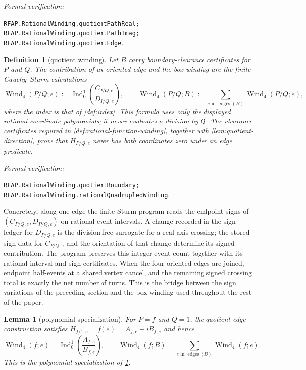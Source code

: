 \documentclass[11pt]{article}
\newtheorem{lemma}[theorem]{Lemma}
\newtheorem{definition}[theorem]{Definition}
\newcommand{\Wind}{\operatorname{Wind}}
\newcommand{\Ind}{\operatorname{Ind}}
\newcommand{\leanref}[1]{\par\smallskip\noindent
  \emph{Formal verification:}\par\nobreak
  {\raggedright\nolinkurl{#1}.\par}}
\begin{document}
\leanref{RFAP.RationalWinding.quotientPathReal;
RFAP.RationalWinding.quotientPathImag;
RFAP.RationalWinding.quotientEdge}

\begin{definition}[quotient winding]
\label{def:quotient-winding}
Let $B$ carry boundary-clearance certificates for $P$ and $Q$.  The
contribution of an oriented edge and the box winding are the finite
Cauchy--Sturm calculations
\[
 \Wind_4(P/Q;e)
   :=\Ind_0^1\!\left(\frac{C_{P/Q,e}}{D_{P/Q,e}}\right),
 \qquad
 \Wind_4(P/Q;B)
   :=\sum_{e\text{ in }\operatorname{edges}(B)}\Wind_4(P/Q;e),
\]
where the index is that of \cref{def:index}.  This formula uses only the
displayed rational coordinate polynomials; it never evaluates a division
by $Q$.  The clearance certificates required in
\cref{def:rational-function-winding}, together with
\cref{lem:quotient-direction}, prove that $H_{P/Q,e}$ never has both
coordinates zero under an edge predicate.
\end{definition}

\leanref{RFAP.RationalWinding.quotientBoundary;
RFAP.RationalWinding.rationalQuadrupledWinding}

Concretely, along one edge the finite Sturm program reads the endpoint signs
of $(C_{P/Q,e},D_{P/Q,e})$ on rational event intervals.  A change recorded
in the sign ledger for $D_{P/Q,e}$ is the division-free surrogate for a
real-axis crossing; the stored sign data for $C_{P/Q,e}$ and the orientation
of that change determine its signed contribution.  The program preserves
this integer event count together with its rational interval and sign
certificates.  When the four oriented edges are joined, endpoint half-events at
a shared vertex cancel, and the remaining signed crossing total is exactly
the net number of turns.  This is the bridge between the sign variations of
the preceding section and the box winding used throughout the rest of the
paper.

\begin{lemma}[polynomial specialization]
\label{lem:polynomial-winding-specialization}
For $P=f$ and $Q=1$, the quotient-edge construction satisfies
$H_{f/1,e}=f(e)=A_{f,e}+iB_{f,e}$ and hence
\[
 \Wind_4(f;e)=\Ind_0^1\!\left(\frac{A_{f,e}}{B_{f,e}}\right),
 \qquad
 \Wind_4(f;B)=\sum_{e\text{ in }\operatorname{edges}(B)}\Wind_4(f;e).
\]
This is the polynomial specialization of \cref{def:quotient-winding}.
\end{lemma}
\end{document}
